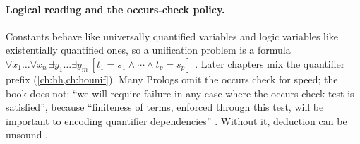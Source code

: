 \paragraph{Logical reading and the occurs-check policy.} Constants behave like universally quantified
variables and logic variables like existentially quantified ones, so a unification problem is a formula
$\forall x_1\ldots\forall x_n\,\exists y_1\ldots\exists y_m\,[t_1=s_1\wedge\cdots\wedge t_p=s_p]$ .
Later chapters mix the quantifier prefix (\cref{ch:hh,ch:hounif}). Many Prologs omit the occurs check for
speed; the book does not: ``we will require failure in any case where the occurs-check test is
satisfied'', because ``finiteness of terms, enforced through this test, will be important to encoding
quantifier dependencies'' . Without it, deduction can be unsound .

